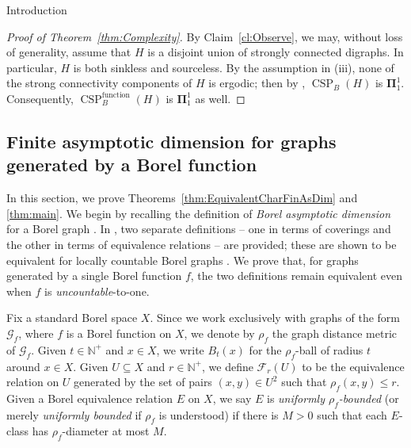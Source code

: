 \documentclass[psamsfonts]{amsart}
\theoremstyle{definition}
\newcommand{\N}{\mathbb N}
\theoremstyle{remark}
\numberwithin{equation}{section}
\newcommand\mbf{\mathbf}
\newcommand\mcal{\mathcal}
\begin{document}
\begin{section}{Introduction}
\begin{proof}[Proof of Theorem~\ref{thm:Complexity}]
    
    By Claim~\ref{cl:Observe}, we may, without loss of generality, assume that $H$ is a disjoint union of strongly connected digraphs.
    In particular, $H$ is both sinkless and sourceless.
    By the assumption in (iii), none of the strong connectivity components of $H$ is ergodic; then by \cite[Corollary~6.3]{thornton2022}, $\operatorname{CSP}_B(H)$ is $\mbf{\Pi}^1_1$.
    Consequently, $\operatorname{CSP}^{\operatorname{function}}_B(H)$ is $\mbf{\Pi}^1_1$ as well.
\end{proof}
    

\section{Finite asymptotic dimension for graphs generated by a Borel function}\label{sec:FinAsDim}


In this section, we prove Theorems~\ref{thm:EquivalentCharFinAsDim} and \ref{thm:main}.
We begin by recalling the definition of \emph{Borel asymptotic dimension} for a Borel graph \cite[Definition~3.2]{cjmst2023}. In \cite{cjmst2023}, two separate definitions -- one in terms of coverings and the other in terms of equivalence relations -- are provided; these are shown to be equivalent for locally countable Borel graphs \cite[Lemma~3.1]{cjmst2023}. We prove that, for graphs generated by a single Borel function $f$, the two definitions remain equivalent even when $f$ is \emph{uncountable}-to-one.

\medskip

Fix a standard Borel space $X$. Since we work exclusively with graphs of the form $\mcal{G}_f$, where $f$ is a Borel function on $X$, we denote by $\rho_f$ the graph distance metric of $\mcal{G}_f$.
Given $t \in \N^+$ and $x \in X$, we write $B_t(x)$ for the $\rho_f$-ball of radius $t$ around $x\in X$.
Given $U\subseteq X$ and $r\in \N^+$, we define $\mathcal{F}_r(U)$ to be the equivalence relation on $U$ generated by the set of pairs $(x,y)\in U^2$ such that $\rho_f(x,y)\le r$.
Given a Borel equivalence relation $E$ on $X$, we say $E$ is \emph{uniformly $\rho_f$-bounded} (or merely \emph{uniformly bounded} if $\rho_f$ is understood) if there is $M > 0$ such that each $E$-class has $\rho_f$-diameter at most $M$.


\end{section}
\end{document}
